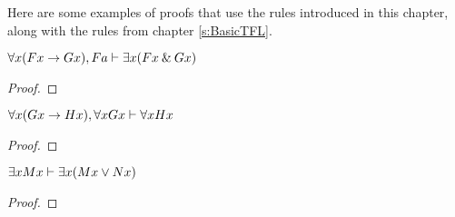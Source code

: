 Here are some examples of proofs that use the rules introduced in this chapter, along with the rules from chapter \ref{s:BasicTFL}.
\bigskip

\begin{earg}


\noindent\begin{minipage}{0.99\textwidth}
\item $\forall x(Fx \rightarrow Gx), Fa \vdash \exists x(Fx \mathbin{\&} Gx)$

\begin{proof}
	 \pr{}
	 \pr{}
	 
	 
	 
	 	
\end{proof}
\bigskip
\end{minipage}

\noindent\begin{minipage}{0.99\textwidth}
\item $\forall x(Gx \rightarrow Hx), \forall xGx \vdash \forall xHx$

\begin{proof}
	 \pr{}
	 \pr{}
	 
	 
	 
	 
\end{proof}
\bigskip
\end{minipage}

\noindent\begin{minipage}{0.99\textwidth}
\item $\exists xMx \vdash \exists x(Mx \vee Nx)$

\begin{proof}
	 \pr{}
	\open
		 \as{}
		 
		 
	\close
	 
\end{proof}
\bigskip
\end{minipage}


\end{earg}
